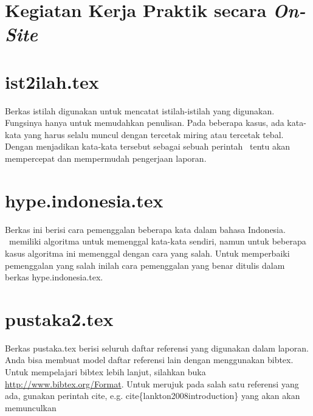 \section{Kegiatan Kerja Praktik secara \textit{On-Site}}

  \subsection{}



\section{ist2ilah.tex}
Berkas istilah digunakan untuk mencatat istilah-istilah yang digunakan. 
Fungsinya hanya untuk memudahkan penulisan.
Pada beberapa kasus, ada kata-kata yang harus selalu muncul dengan tercetak 
miring atau tercetak tebal. 
Dengan menjadikan kata-kata tersebut sebagai sebuah perintah \latex~tentu akan 
mempercepat dan mempermudah pengerjaan laporan. 


\section{hype.indonesia.tex}
Berkas ini berisi cara pemenggalan beberapa kata dalam bahasa Indonesia. 
\latex~memiliki algoritma untuk memenggal kata-kata sendiri, namun untuk 
beberapa kasus algoritma ini memenggal dengan cara yang salah. 
Untuk memperbaiki pemenggalan yang salah inilah cara pemenggalan yang benar 
ditulis dalam berkas hype.indonesia.tex.


\section{pustaka2.tex}
Berkas pustaka.tex berisi seluruh daftar referensi yang digunakan dalam 
laporan. 
Anda bisa membuat model daftar referensi lain dengan menggunakan bibtex.
Untuk mempelajari bibtex lebih lanjut, silahkan buka 
\url{http://www.bibtex.org/Format}. 
Untuk merujuk pada salah satu referensi yang ada, gunakan perintah \bslash 
cite, e.g. \bslash cite\{lankton2008introduction\} yang akan akan memunculkan 
\cite{edgrant2025kptemplate}
\cite{febrian2017uitemplate}


